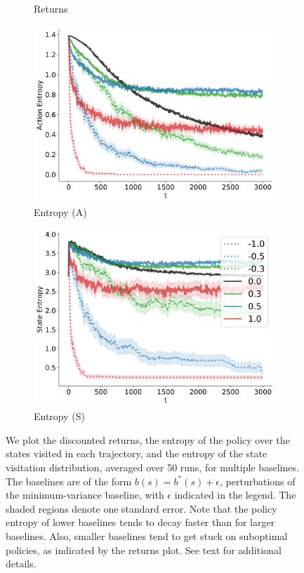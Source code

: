 \begin{figure}
\begin{subfigure}[b]{0.25\linewidth}
    \caption{Returns}
    \label{fig:4rooms_return}
  \end{subfigure}
    \begin{subfigure}[b]{0.25\linewidth}
    \includegraphics[width=\textwidth]{articles/baselines/figs/baseline_4rooms/NPG_action_entropy.png}
    \caption{Entropy (A)}
    \label{fig:4rooms_action}
  \end{subfigure}
  \begin{subfigure}[b]{0.25\linewidth}
    \includegraphics[width=\textwidth]{articles/baselines/figs/baseline_4rooms/NPG_state_entropy.png}
    \caption{Entropy (S)}
    \label{fig:4rooms_state}
  \end{subfigure}
  \caption{We plot the discounted returns, the entropy of the policy over the states visited in each trajectory, and the entropy of the state visitation distribution, averaged over 50 runs, for multiple baselines. The baselines are of the form $b(s) = b^*(s) + \epsilon$, perturbations of the minimum-variance baseline, with $\epsilon$ indicated in the legend. The shaded regions denote one standard error. Note that the policy entropy of lower baselines tends to decay faster than for larger baselines. Also, smaller baselines tend to get stuck on suboptimal policies, as indicated by the returns plot. See text for additional details.~\label{fig:stats_4rooms}}
\end{figure}
